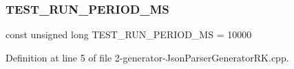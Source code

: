 \subsubsection{\texorpdfstring{T\+E\+S\+T\+\_\+\+R\+U\+N\+\_\+\+P\+E\+R\+I\+O\+D\+\_\+\+MS}{TEST\_RUN\_PERIOD\_MS}}
{\footnotesize\ttfamily const unsigned long T\+E\+S\+T\+\_\+\+R\+U\+N\+\_\+\+P\+E\+R\+I\+O\+D\+\_\+\+MS = 10000}



Definition at line 5 of file 2-\/generator-\/\+Json\+Parser\+Generator\+R\+K.\+cpp.

